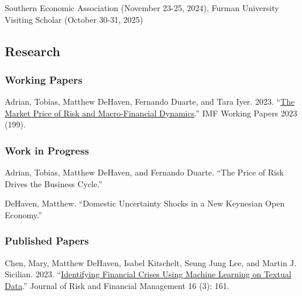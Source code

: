 \documentclass[
  letterpaper,
  DIV=11,
  numbers=noendperiod]{scrartcl}
\begin{document}
Southern Economic Association (November 23-25, 2024), Furman University
Visiting Scholar (October 30-31, 2025)

\newpage

\subsection{Research}\vspace{-20pt}

\noindent\makebox[\linewidth]{\rule{\textwidth}{0.5pt}}

\subsubsection*{Working Papers}

Adrian, Tobias, Matthew DeHaven, Fernando Duarte, and Tara Iyer. 2023.
``\href{https://doi.org/10.5089/9798400255397.001}{The Market Price of Risk and Macro-Financial Dynamics}.''
IMF Working Papers 2023 (199).

\subsubsection*{Work in Progress}

Adrian, Tobias, Matthew DeHaven, and Fernando Duarte. ``The Price of
Risk Drives the Business Cycle.''

DeHaven, Matthew. ``Domestic Uncertainty Shocks in a New Keynesian Open
Economy.''

\subsubsection*{Published Papers}

Chen, Mary, Matthew DeHaven, Isabel Kitschelt, Seung Jung Lee, and
Martin J. Sicilian. 2023.
``\href{https://doi.org/10.3390/jrfm16030161}{Identifying Financial Crises Using Machine Learning on Textual Data}.''
Journal of Risk and Financial Management 16 (3): 161.
\end{document}
